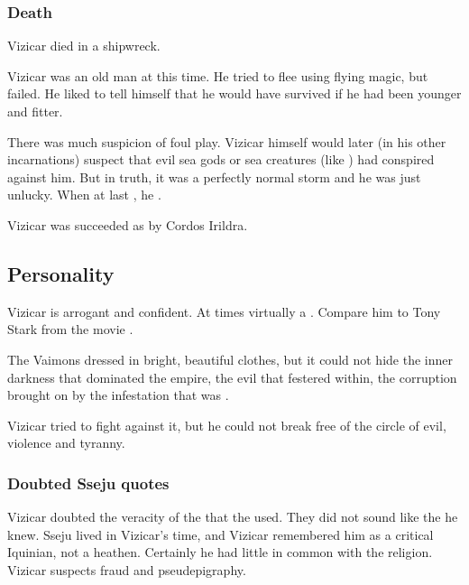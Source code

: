 \subsubsection{Death}
Vizicar died in a shipwreck.

Vizicar was an old man at this time. 
He tried to flee using flying magic, but failed. 
He liked to tell himself that he would have survived if he had been younger and fitter. 

There was much suspicion of foul play. 
Vizicar himself would later (in his other incarnations) suspect that evil sea gods or sea creatures (like \nagae) had conspired against him. 
But in truth, it was a perfectly normal storm and he was just unlucky.
When at last , he . 

Vizicar was succeeded as \VaimonCaliph by Cordos Irildra. 









\subsection{Personality}
Vizicar is arrogant and confident. 
At times virtually a . 
Compare him to Tony Stark from the movie \cite{Movie:IronMan}. 

The Vaimons dressed in bright, beautiful clothes, but it could not hide the inner darkness that dominated the empire, the evil that festered within, the corruption brought on by the infestation that was \iquin. 

Vizicar tried to fight against it, but he could not break free of the circle of evil, violence and tyranny. 





\subsubsection{Doubted Sseju quotes}
Vizicar doubted the veracity of the  that the \Ortaicans used. 
They did not sound like the  he knew. 
Sseju lived in Vizicar's time, and Vizicar remembered him as a critical Iquinian, not a heathen. 
Certainly he had little in common with the \Ortaican religion. 
Vizicar suspects fraud and pseudepigraphy. 





























